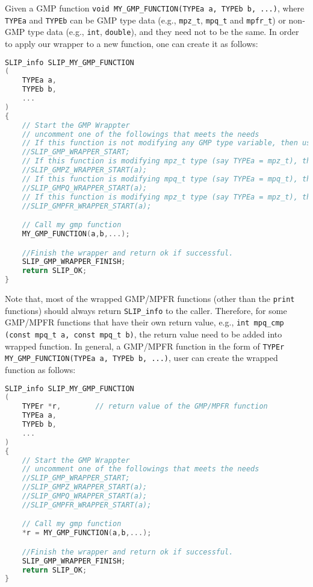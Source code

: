 \documentclass[11pt]{article}
\theoremstyle{definition}
\begin{document}
Given a GMP function \verb|void MY_GMP_FUNCTION(TYPEa a, TYPEb b, ...)|, where \verb|TYPEa| and \verb|TYPEb| can be GMP type data (e.g., \verb|mpz_t|, \verb|mpq_t| and \verb|mpfr_t|) or non-GMP type data (e.g., \verb|int|, \verb|double|), and they need not to be the same. In order to apply our wrapper to a new function, one can create it as follows:

\begin{lstlisting}[language=C,frame=single]
SLIP_info SLIP_MY_GMP_FUNCTION
(
    TYPEa a,
    TYPEb b,
    ...
)
{
    // Start the GMP Wrappter
    // uncomment one of the followings that meets the needs
    // If this function is not modifying any GMP type variable, then use
    //SLIP_GMP_WRAPPER_START;
    // If this function is modifying mpz_t type (say TYPEa = mpz_t), then use
    //SLIP_GMPZ_WRAPPER_START(a);
    // If this function is modifying mpq_t type (say TYPEa = mpq_t), then use
    //SLIP_GMPQ_WRAPPER_START(a);
    // If this function is modifying mpz_t type (say TYPEa = mpz_t), then use
    //SLIP_GMPFR_WRAPPER_START(a);

    // Call my gmp function
    MY_GMP_FUNCTION(a,b,...);

    //Finish the wrapper and return ok if successful.
    SLIP_GMP_WRAPPER_FINISH;
    return SLIP_OK;
}
\end{lstlisting}

Note that, most of the wrapped GMP/MPFR functions (other than the \verb|print| functions) should always return \verb|SLIP_info| to the caller. Therefore, for some GMP/MPFR functions that have their own return value, e.g., \verb|int mpq_cmp (const mpq_t a, const mpq_t b)|, the return value need to be added into wrapped function. In general, a GMP/MPFR function in the form of \verb|TYPEr MY_GMP_FUNCTION(TYPEa a, TYPEb b, ...)|, user can create the wrapped function as follows:

\newpage

\begin{lstlisting}[language=C,frame=single]
SLIP_info SLIP_MY_GMP_FUNCTION
(
    TYPEr *r,        // return value of the GMP/MPFR function
    TYPEa a,
    TYPEb b,
    ...
)
{
    // Start the GMP Wrappter
    // uncomment one of the followings that meets the needs
    //SLIP_GMP_WRAPPER_START;
    //SLIP_GMPZ_WRAPPER_START(a);
    //SLIP_GMPQ_WRAPPER_START(a);
    //SLIP_GMPFR_WRAPPER_START(a);

    // Call my gmp function
    *r = MY_GMP_FUNCTION(a,b,...);

    //Finish the wrapper and return ok if successful.
    SLIP_GMP_WRAPPER_FINISH;
    return SLIP_OK;
}
\end{lstlisting}
\end{document}
